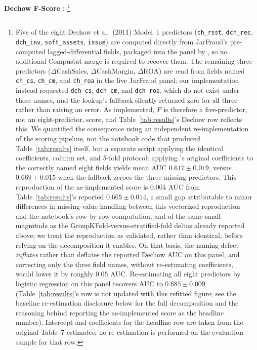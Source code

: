 \documentclass[12pt]{article}
\begin{document}
\textbf{Dechow F-Score \citep{dechow2011}:}%
\footnote{Five of the eight Dechow et al.\ (2011) Model~1 predictors
(\texttt{ch\_rsst}, \texttt{dch\_rec}, \texttt{dch\_inv},
\texttt{soft\_assets}, \texttt{issue}) are computed directly from
JarFraud's pre-computed lagged-differential fields, packaged into the
panel by \citet{bao2020}, so no additional Compustat merge is required to
recover them.  The remaining three predictors ($\Delta$CashSales,
$\Delta$CashMargin, $\Delta$ROA) are read from fields named
\texttt{ch\_cs}, \texttt{ch\_cm}, and \texttt{ch\_roa} in the live JarFraud
panel; our implementation instead requested \texttt{dch\_cs},
\texttt{dch\_cm}, and \texttt{dch\_roa}, which do not exist under those
names, and the lookup's fallback silently returned zero for all three
rather than raising an error.  As implemented, $F$ is therefore a
five-predictor, not an eight-predictor, score, and Table~\ref{tab:results}'s
Dechow row reflects this.  We quantified the consequence using an
independent re-implementation of the scoring pipeline, not the notebook
code that produced Table~\ref{tab:results} itself, but a separate script
applying the identical coefficients, column set, and 5-fold protocol:
applying \citet{dechow2011}'s original coefficients to the correctly named
eight fields yields mean AUC $0.617\pm0.019$, versus $0.669\pm0.015$ when
the fallback zeroes the three missing predictors.  This reproduction of
the as-implemented score is $0.004$ AUC from Table~\ref{tab:results}'s
reported $0.665\pm0.014$, a small gap attributable to minor differences in
missing-value handling between this vectorized reproduction and the
notebook's row-by-row computation, and of the same small magnitude as the
GroupKFold-versus-stratified-fold deltas already reported above; we treat
the reproduction as validated, rather than identical, before relying on
the decomposition it enables.  On that basis, the naming defect
\emph{inflates} rather than
deflates the reported Dechow AUC on this panel, and correcting only the
three field names, without re-estimating coefficients, would lower it by
roughly $0.05$ AUC.  Re-estimating all eight predictors by logistic
regression on this panel recovers AUC to $0.685\pm0.009$
(Table~\ref{tab:results}'s row is not updated with this refitted figure;
see the baseline re-estimation disclosure below for the full decomposition
and the reasoning behind reporting the as-implemented score as the
headline number). Intercept and coefficients for the headline row are
taken from the original \citet{dechow2011} Table~7 estimates; no
re-estimation is performed on the evaluation sample for that row.}
\end{document}
